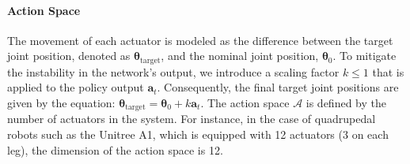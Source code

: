 

\paragraph{Action Space}  
The movement of each actuator is modeled as the difference between the target joint position, denoted as \(\mathbf{\theta}_{\text{target}}\), and the nominal joint position, \(\mathbf{\theta}_0\). To mitigate the instability in the network's output, we introduce a scaling factor \(k \leq 1\) that is applied to the policy output \(\mathbf{a}_{t}\). Consequently, the final target joint positions are given by the equation:  
\(\mathbf{\theta}_{\text{target}} = \mathbf{\theta}_0 + k \mathbf{a}_{t}\).
The action space \(\mathcal{A}\) is defined by the number of actuators in the system. For instance, in the case of quadrupedal robots such as the Unitree A1, which is equipped with 12 actuators (3 on each leg), the dimension of the action space is 12.